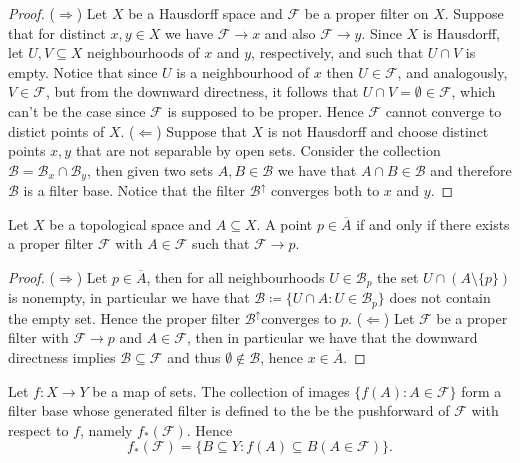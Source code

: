 \begin{proof}
  (\(\Rightarrow\)) Let \(X\) be a Hausdorff space and \(\mathcal F\) be a
  proper filter on \(X\). Suppose that for distinct \(x, y \in X\) we have
  \(\mathcal F \to x\) and also \(\mathcal F \to y\). Since \(X\) is Hausdorff,
  let \(U, V \subseteq X\) neighbourhoods of \(x\) and \(y\), respectively, and
  such that \(U \cap V\) is empty. Notice that since \(U\) is a neighbourhood of
  \(x\) then \(U \in \mathcal F\), and analogously, \(V \in \mathcal F\), but
  from the downward directness, it follows that \(U \cap V = \emptyset \in
  \mathcal F\), which can't be the case since \(\mathcal F\) is supposed to be
  proper. Hence \(\mathcal F\) cannot converge to distict points of \(X\).
  (\(\Leftarrow\)) Suppose that \(X\) is not Hausdorff and choose distinct
  points \(x, y\) that are not separable by open sets. Consider the collection
  \(\mathcal B = \mathcal B_x \cap \mathcal B_y\), then given two sets \(A, B
  \in \mathcal B\) we have that \(A \cap B \in \mathcal B\) and therefore
  \(\mathcal B\) is a filter base. Notice that the filter \(\mathcal B^\uparrow\)
  converges both to \(x\) and \(y\).
\end{proof}

\begin{proposition}[Closed]\label{prop: closed from filter}
  Let \(X\) be a topological space and \(A \subseteq X\). A point \(p \in
  \overline A\) if and only if there exists a proper filter \(\mathcal F\) with
  \(A \in \mathcal F\) such that \(\mathcal F \to p\).
\end{proposition}

\begin{proof}
  (\(\Rightarrow\)) Let \(p \in \overline A\), then for all neighbourhoods \(U
  \in \mathcal B_p\) the set \(U \cap (A \setminus \{p\})\) is nonempty, in
  particular we have that \(\mathcal B \coloneq \{U \cap A \colon U \in \mathcal B_p\}\)
  does not contain the empty set. Hence the proper filter \(\mathcal
  B^\uparrow\)converges to \(p\). (\(\Leftarrow\)) Let \(\mathcal F\) be a
  proper filter with \(\mathcal F \to p\) and \(A \in \mathcal F\), then in
  particular we have that the downward directness implies \(\mathcal B \subseteq
  \mathcal F\) and thus \(\emptyset \not\in \mathcal B\), hence \(x \in
  \overline A\).
\end{proof}

\begin{definition}\label{def: pushforward of filters}
  Let \(f: X \to Y\) be a map of sets. The collection of images \(\{f(A) \colon A \in
  \mathcal F\}\) form a filter base whose generated filter is defined to the be
  the pushforward of \(\mathcal F\) with respect to \(f\), namely
  \(f_\ast(\mathcal F)\). Hence
  \[
    f_\ast(\mathcal F) = \{B \subseteq Y \colon f(A) \subseteq B (A \in \mathcal
    F)\}.
  \]
\end{definition}

